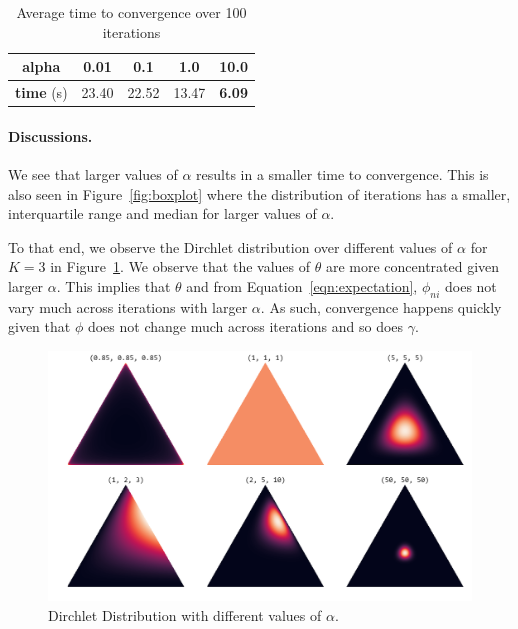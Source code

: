 \documentclass[a4paper]{article}
\begin{document}
	\begin{table}[ht]
		\centering
		\begin{tabular}{|c||c|c|c|c|}
			\hline
			\textbf{alpha} & 0.01 & 0.1 & 1.0 & 10.0
			\\
			\hline
			\textbf{time} (s) & 23.40 & 22.52 & 13.47 & \textbf{6.09}\\
			\hline
		\end{tabular}
		\caption{Average time to convergence over 100 iterations}
		\label{tab:time}
	\end{table}
	\paragraph{Discussions.} We see that larger values of $\alpha$ results in a smaller time to convergence. This is also seen in Figure~\ref{fig:boxplot} where the distribution of iterations has a smaller, interquartile range and median for larger values of $\alpha$. 
	
	To that end, we observe the Dirchlet distribution over different values of $\alpha$ for $K=3$ in Figure~\ref{fig:alpha}. We observe that the values of $\theta$ are more concentrated given larger $\alpha$. This implies that $\theta$ and from Equation~\ref{eqn:expectation}, $\phi_{ni}$ does not vary much across iterations with larger $\alpha$. As such, convergence happens quickly given that $\phi$ does not change much across iterations and so does $\gamma$.
	
	\begin{figure}
		\centering
		\includegraphics[width=1\linewidth]{images/alpha}
		\caption{Dirchlet Distribution with different values of $\alpha$.}
		\label{fig:alpha}
	\end{figure}
	
	
	\clearpage
	
\end{document}
